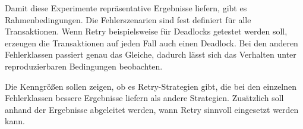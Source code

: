 Damit diese Experimente repräsentative Ergebnisse liefern, gibt es Rahmenbedingungen.
Die Fehlerszenarien sind fest definiert für alle Transaktionen.
Wenn Retry beispielsweise für Deadlocks getestet werden soll, erzeugen die Transaktionen auf jeden Fall auch
einen Deadlock.
Bei den anderen Fehlerklassen passiert genau das Gleiche, dadurch lässt sich das Verhalten unter reproduzierbaren
Bedingungen beobachten.

Die Kenngrößen sollen zeigen, ob es Retry-Strategien gibt, die bei den einzelnen Fehlerklassen bessere
Ergebnisse liefern als andere Strategien.
Zusätzlich soll anhand der Ergebnisse abgeleitet werden, wann Retry sinnvoll eingesetzt werden kann.